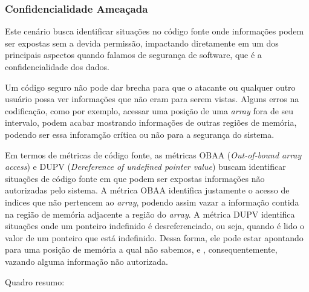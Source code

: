 %
%
%
%


\subsubsection{Confidencialidade Ameaçada}

Este cenário busca identificar situações no código fonte onde informações podem ser expostas sem a devida permissão, impactando diretamente em um dos principais aspectos quando falamos de segurança de software, que é a confidencialidade dos dados.

Um código seguro não pode dar brecha para que o atacante ou qualquer outro usuário possa ver informações que não eram para serem vistas. Alguns erros na codificação, como por exemplo, acessar uma posição de uma \emph{array} fora de seu intervalo, podem acabar mostrando informações de outras regiões de memória, podendo ser essa inforamção crítica ou não para a segurança do sistema.

Em termos de métricas de código fonte, as métricas OBAA (\emph{Out-of-bound array access}) e DUPV (\emph{Dereference of undefined pointer value}) buscam identificar situações de código fonte em que podem ser expostas informações não autorizadas pelo sistema. A métrica OBAA identifica justamente o acesso de indices que não pertencem ao \emph{array}, podendo assim vazar a informação contida na região de memória adjacente a região do \emph{array}. A métrica DUPV identifica situações onde um ponteiro indefinido é desreferenciado, ou seja, quando é lido o valor de um ponteiro que está indefinido. Dessa forma, ele pode estar apontando para uma posição de memória a qual não sabemos, e , consequentemente, vazando alguma informação não autorizada. 

Quadro resumo:

